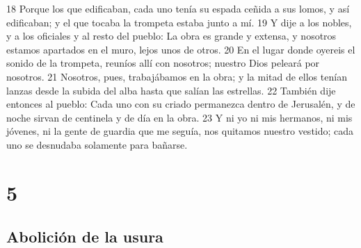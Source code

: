 18 Porque los que edificaban, cada uno tenía su espada ceñida a sus lomos, y así edificaban; y el que tocaba la trompeta estaba junto a mí.
19 Y dije a los nobles, y a los oficiales y al resto del pueblo: La obra es grande y extensa, y nosotros estamos apartados en el muro, lejos unos de otros.
20 En el lugar donde oyereis el sonido de la trompeta, reuníos allí con nosotros; nuestro Dios peleará por nosotros.
21 Nosotros, pues, trabajábamos en la obra; y la mitad de ellos tenían lanzas desde la subida del alba hasta que salían las estrellas.
22 También dije entonces al pueblo: Cada uno con su criado permanezca dentro de Jerusalén, y de noche sirvan de centinela y de día en la obra.
23 Y ni yo ni mis hermanos, ni mis jóvenes, ni la gente de guardia que me seguía, nos quitamos nuestro vestido; cada uno se desnudaba solamente para bañarse.

\chapter{5}

\section*{Abolición de la usura}

